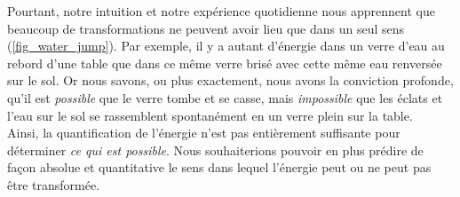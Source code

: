 		Pourtant, notre intuition et notre expérience quotidienne nous apprennent que beaucoup de transformations ne peuvent avoir lieu que dans un seul sens (\cref{fig_water_jump}). Par exemple, il y a autant d’énergie dans un verre d’eau au rebord d’une table que dans ce même verre brisé avec cette même eau renversée sur le sol. Or nous savons, ou plus exactement, nous avons la conviction profonde, qu’il est \emph{possible} que le verre tombe et se casse, mais \emph{impossible} que les éclats et l’eau sur le sol se rassemblent spontanément en un verre plein sur la table.\\
		Ainsi, la quantification de l’énergie n’est pas entièrement suffisante pour déterminer \emph{ce qui est possible}. Nous souhaiterions pouvoir en plus prédire de façon absolue et quantitative le sens dans lequel l’énergie peut ou ne peut pas être transformée.

